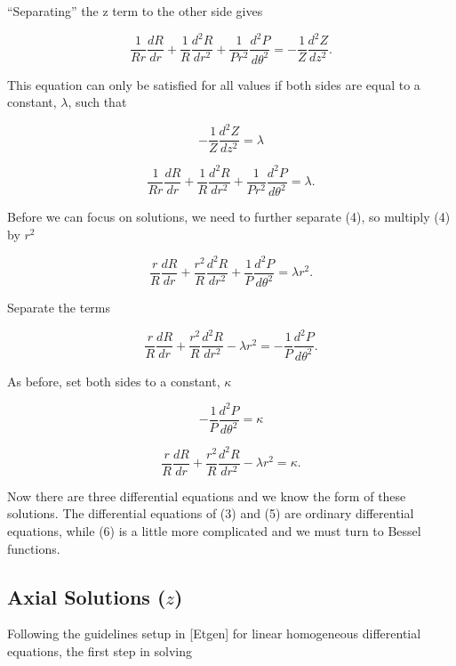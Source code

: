\documentclass[12pt]{article}
\begin{document}
``Separating'' the z term to the other side gives

$$\frac{1}{Rr} \frac{d R}{d r} + \frac{1}{R} \frac{d^2R}{d r^2} + \frac{1}{Pr^2} \frac{d^2P}{d \theta^2} = - \frac{1}{Z} \frac{d^2 Z}{dz^2}.$$

This equation can only be satisfied for all values if both sides are equal to a constant, $\lambda$, such that

\begin{equation}
-\frac{1}{Z} \frac{d^2 Z}{dz^2} = \lambda
\end{equation}

\begin{equation}
\frac{1}{Rr} \frac{d R}{d r} + \frac{1}{R} \frac{d^2R}{d r^2} + \frac{1}{Pr^2} \frac{d^2P}{d\theta^2} = \lambda.
\end{equation}

Before we can focus on solutions, we need to further separate (4), so multiply (4) by $r^2$

$$\frac{r}{R} \frac{d R}{d r} + \frac{r^2}{R} \frac{d^2R}{d r^2} + \frac{1}{P} \frac{d^2P}{d\theta^2} = \lambda r^2.$$

Separate the terms

$$\frac{r}{R} \frac{d R}{d r} + \frac{r^2}{R} \frac{d^2R}{d r^2} - \lambda r^2 = - \frac{1}{P} \frac{d^2P}{d \theta^2}.$$

As before, set both sides to a constant, $\kappa$

\begin{equation}
- \frac{1}{P} \frac{d^2P}{d \theta^2}= \kappa
\end{equation}

\begin{equation}
\frac{r}{R} \frac{dR}{d r} + \frac{r^2}{R} \frac{d^2R}{d r^2} - \lambda r^2  = \kappa.
\end{equation}

Now there are three differential equations and we know the form of these solutions.  The differential equations of
(3) and (5) are ordinary differential equations, while (6) is a little more complicated and we must turn to Bessel functions.

\subsection{Axial Solutions ($z$)}

Following the guidelines setup in [Etgen] for linear homogeneous differential equations, the first step in solving
\end{document}
